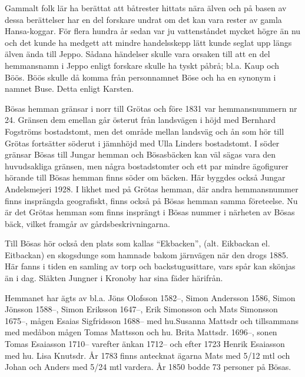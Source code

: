 %



Gammalt folk lär ha berättat att båtrester hittats nära älven och på basen av dessa berättelser har en del forskare undrat om det kan vara rester av gamla Hansa-koggar. För flera hundra år sedan var ju vattenståndet mycket högre än nu och det kunde ha medgett att mindre handelsskepp lätt kunde seglat upp längs älven ända till Jeppo. Sådana händelser skulle vara orsaken till att en del hemmansnamn i Jeppo enligt forskare skulle ha tyskt påbrå; bl.a. Kaup och Böös. Böös skulle då komma från personnamnet Böse och ha en synonym i namnet Buse. Detta enligt Karsten.

Bösas hemman gränsar i norr till Grötas och före 1831 var hemmansnummern nr 24. Gränsen dem emellan går österut från landsvägen i höjd med Bernhard Fogströms bostadstomt, men det område mellan landsväg  och ån som hör till Grötas fortsätter söderut i jämnhöjd med Ulla Linders bostadstomt. I söder gränsar Bösas till Jungar hemman och Bösasbäcken kan väl sägas vara den huvudsakliga gränsen, men några bostadstomter och ett par mindre ägofigurer hörande till Bösas hemman finns söder om bäcken. Här byggdes också Jungar Andelsmejeri 1928. I likhet med på Grötas hemman, där andra hemmansnummer finns insprängda geografiskt, finns också på Bösas hemman samma företeelse. Nu är det Grötas hemman som finns insprängt i Bösas nummer i närheten av Bösas bäck, vilket framgår av gårdsbeskrivningarna.

Till Bösas hör också den plats som kallas ``Ekbacken'', (alt. Eikbackan el. Eitbackan) en skogsdunge som hamnade bakom järnvägen när den drogs 1885. Här fanns i tiden en samling av torp och backstugusittare, vars spår kan skönjas än i dag. Släkten Jungner i Kronoby har sina fäder härifrån.

Hemmanet har ägts av bl.a. Jöns Olofsson 1582--, Simon Andersson 1586, Simon Jönsson 1588--, Simon Eriksson 1647--, Erik Simonsson och Mats Simonsson 1675--,  mågen Esaias Sigfridsson 1688-- med hu.Susanna Mattsdr och tillsammans med medåbon mågen Tomas Mattsson och hu. Brita Mattsdr. 1696--, sonen Tomas Esaiasson 1710-- varefter änkan 1712-- och efter 1723 Henrik Esaiasson med hu. Lisa Knutsdr. År 1783 finns antecknat ägarna Mats med 5/12 mtl och Johan och Anders med 5/24 mtl vardera. År 1850 bodde 73 personer på Bösas.

